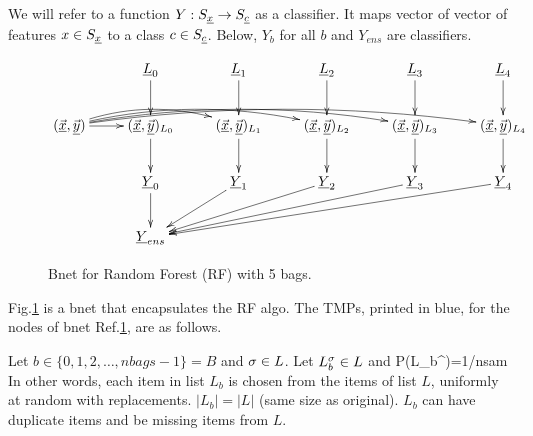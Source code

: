 We will refer to a function
$Y:S_{\underline{x}} \rightarrow S_{\underline{c}}$
as a
classifier. It maps vector
of vector of features $x\in S_{\underline{x}}$
to a class $c\in S_{\underline{c}}$. Below, 
$Y_b$ for all $b$
and $Y_{ens}$
are classifiers.


\begin{figure}
$$
\xymatrix{
&
\rvL_0\ar[d]
&
\rvL_1\ar[d]
&
\rvL_2\ar[d]
&
\rvL_3\ar[d]
&
\rvL_4\ar[d]
\\
(\vec{\rvx},\vec{\rvy})
\ar[r]
\ar@/^1pc/[rr]
\ar@/^1pc/[rrr]
\ar@/^1pc/[rrrr]
\ar@/^1pc/[rrrrr]
&
(\vec{\rvx},\vec{\rvy})_{L_0}\ar[d]
&
(\vec{\rvx},\vec{\rvy})_{L_1}\ar[d]
&
(\vec{\rvx},\vec{\rvy})_{L_2}\ar[d]
&
(\vec{\rvx},\vec{\rvy})_{L_3}\ar[d]
&
(\vec{\rvx},\vec{\rvy})_{L_4}\ar[d]
\\
&
\rvY_0\ar[d]
&
\rvY_1\ar[dl]
&
\rvY_2\ar[dll]
&
\rvY_3\ar[dlll]
&
\rvY_4\ar[dllll]
\\
&
\rvY_{ens}
}
$$
\caption{Bnet for Random Forest (RF)
with 5 bags.}
\label{fig-rf-5-bags}
\end{figure}

Fig.\ref{fig-rf-5-bags}
is a bnet that encapsulates the RF algo.
The TMPs, printed in blue, for the
nodes of
bnet Ref.\ref{fig-rf-5-bags},
are as follows.


Let $b\in\{0, 1, 2, \ldots, nbags-1\}=B$
and $\sigma\in L$. Let $L^\sigma_b\in L$ and
\beq\color{blue}
P(L_b^\s)=1/nsam
\eeq
In other words, each item in list $L_b$ 
is chosen from the items of list $L$, uniformly at random
with replacements.
 $|L_b|=|L|$ (same size as original).
$L_b$ can have duplicate items and be missing
items from $L$.

